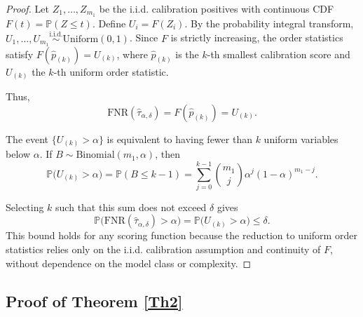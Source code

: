 \documentclass[journal,twoside,web]{ieeecolor}
\begin{document}
\begin{proof}
Let $Z_1, \dots, Z_{m_1}$ be the i.i.d. calibration positives with continuous CDF $F(t) = \mathbb{P}(Z \leq t)$. 
Define $U_i = F(Z_i)$. 
By the probability integral transform, $U_1, \dots, U_{m_1} \stackrel{\text{i.i.d.}}{\sim} \mathrm{Uniform}(0,1)$. 
Since $F$ is strictly increasing, the order statistics satisfy $F(\hat{p}_{(k)}) = U_{(k)}$, where $\hat{p}_{(k)}$ is the $k$-th smallest calibration score and $U_{(k)}$ the $k$-th uniform order statistic.  

Thus,
\[
\mathrm{FNR}(\hat{\tau}_{\alpha,\delta}) = F(\hat{p}_{(k)}) = U_{(k)}.
\]

The event $\{U_{(k)} > \alpha\}$ is equivalent to having fewer than $k$ uniform variables below $\alpha$. 
If $B \sim \mathrm{Binomial}(m_1, \alpha)$, then
\[
\mathbb{P}\bigl(U_{(k)} > \alpha\bigr) 
= \mathbb{P}(B \le k-1) 
= \sum_{j=0}^{k-1} \binom{m_1}{j} \alpha^j (1-\alpha)^{m_1-j}.
\]

Selecting $k$ such that this sum does not exceed $\delta$ gives
\[
\mathbb{P}\bigl(\mathrm{FNR}(\hat{\tau}_{\alpha,\delta}) > \alpha\bigr) = \mathbb{P}\bigl(U_{(k)} > \alpha\bigr) \le \delta.
\]
This bound holds for any scoring function because the reduction to uniform order statistics relies only on the i.i.d. calibration assumption and continuity of $F$, without dependence on the model class or complexity.
\end{proof}

\subsection{Proof of Theorem \ref{Th2}}\label{S6-2}
\end{document}
